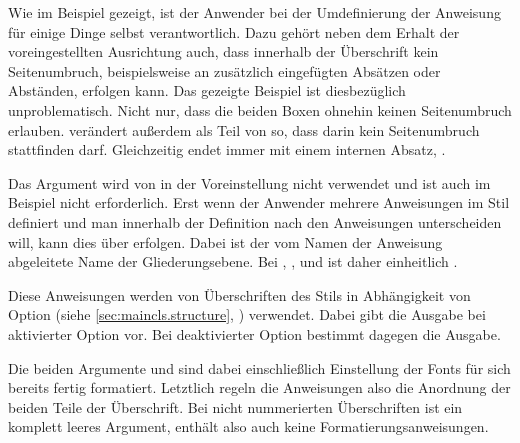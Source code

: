 Wie im Beispiel gezeigt, ist der Anwender bei der Umdefinierung der Anweisung
für einige Dinge selbst verantwortlich. Dazu gehört neben dem Erhalt der
voreingestellten Ausrichtung auch, dass innerhalb der Überschrift kein
Seitenumbruch, beispielsweise an zusätzlich eingefügten Absätzen oder
Abständen, erfolgen kann. Das gezeigte Beispiel ist diesbezüglich
unproblematisch. Nicht nur, dass die beiden Boxen ohnehin keinen Seitenumbruch
erlauben. \KOMAScript{} verändert außerdem  als Teil
von  so, dass darin kein Seitenumbruch stattfinden
darf. Gleichzeitig endet  immer mit einem internen Absatz,
.

Das Argument  wird von
 in der Voreinstellung nicht verwendet und
ist auch im Beispiel nicht erforderlich. Erst wenn der Anwender mehrere
Anweisungen im Stil  definiert und man innerhalb der Definition
nach den Anweisungen unterscheiden will, kann dies über 
erfolgen. Dabei ist  der vom Namen der Anweisung abgeleitete Name
der Gliederungsebene. Bei ,
,  und
 ist  daher einheitlich
.%
\EndIndexGroup

\begin{Declaration}
\end{Declaration}
Diese Anweisungen
werden von Überschriften des Stils  in Abhängigkeit
von Option %
 (siehe
\autoref{sec:maincls.structure}, )
verwendet. Dabei gibt  die Ausgabe bei
aktivierter Option vor. Bei deaktivierter Option
bestimmt dagegen  die Ausgabe.

Die beiden Argumente  und  sind dabei
einschließlich Einstellung der Fonts für sich bereits fertig
formatiert. Letztlich regeln die Anweisungen also die Anordnung der beiden
Teile der Überschrift. Bei nicht nummerierten Überschriften ist 
ein komplett leeres Argument, enthält also auch keine
Formatierungsanweisungen.

